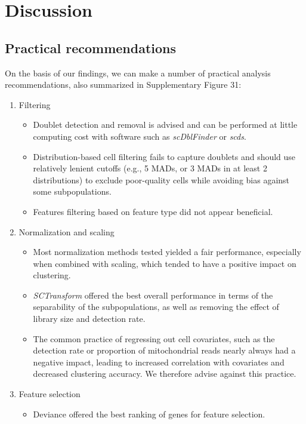 \documentclass{bmcart}
\begin{document}
\section*{Discussion}

\subsection*{Practical recommendations}

On the basis of our findings, we can make a number of practical analysis recommendations, also summarized in Supplementary Figure 31:

\begin{enumerate}
   \item Filtering
   \begin{itemize}
     \item Doublet detection and removal is advised and can be performed at little computing cost with software such as \textit{scDblFinder} or \textit{scds}.
     \item Distribution-based cell filtering fails to capture doublets and should use relatively lenient cutoffs (e.g., 5 MADs, or 3 MADs in at least 2 distributions) to exclude poor-quality cells while avoiding bias against some subpopulations.
     \item Features filtering based on feature type did not appear beneficial.
   \end{itemize}
   \item Normalization and scaling
   \begin{itemize}
     \item Most normalization methods tested yielded a fair performance, especially when combined with scaling, which tended to have a positive impact on clustering.
     \item \textit{SCTransform} offered the best overall performance in terms of the separability of the subpopulations, as well as removing the effect of library size and detection rate.
     \item The common practice of regressing out cell covariates, such as the detection rate or proportion of mitochondrial reads nearly always had a negative impact, leading to increased correlation with covariates and decreased clustering accuracy. We therefore advise against this practice.
   \end{itemize}
   \item Feature selection
   \begin{itemize}
     \item Deviance \cite{townesGlmpca2019} offered the best ranking of genes for feature selection.

\end{itemize}
\end{enumerate}
\end{document}
